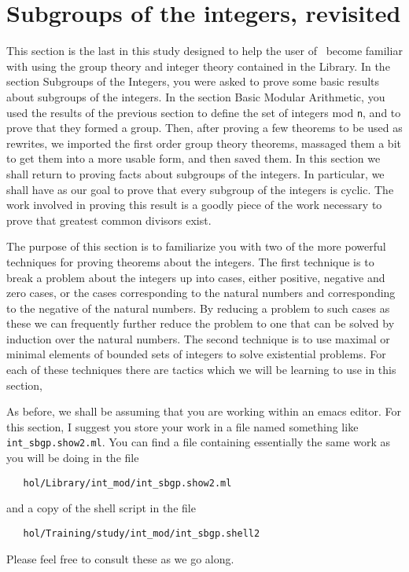 \section{Subgroups of the integers, revisited}

This section is the last in this study designed to help the user of
\HOL\ become familiar with using the group theory and integer theory
contained in the Library.  In the section Subgroups of the Integers,
you were asked to prove some basic results about subgroups of the
integers.  In the section Basic Modular Arithmetic, you used the
results of the previous section to define the set of integers mod
{\small\tt n}, and to prove that they formed a group.  Then, after
proving a few theorems to be used as rewrites, we imported the first
order group theory theorems, massaged them a bit to get them into a
more usable form, and then saved them.  In this section we shall
return to proving facts about subgroups of the integers.  In
particular, we shall have as our goal to prove that every subgroup of
the integers is cyclic.  The work involved in proving this result is a
goodly piece of the work necessary to prove that greatest common
divisors exist.

The purpose of this section is to familiarize you with two of the
more powerful techniques for proving theorems about the integers.
The first technique is to break a problem about the integers up into
cases, either positive, negative and zero cases, or the cases
corresponding to the natural numbers and corresponding to the negative
of the natural numbers.  By reducing a problem to such cases as these
we can frequently further reduce the problem to one that can be solved
by induction over the natural numbers.  The second technique is to use
maximal or minimal elements of bounded sets of integers to solve
existential problems.  For each of these techniques there are tactics
which we will be learning to use in this section,

As before, we shall be assuming that you are working within an emacs
editor.  For this section, I suggest you store your work in a file
named something like {\small\verb+int_sbgp.show2.ml+}.  You can find a
file containing essentially the same work as you will be doing in the
file
\begin{verbatim}
   hol/Library/int_mod/int_sbgp.show2.ml
\end{verbatim}
and a copy of the shell script in the file
\begin{verbatim}
   hol/Training/study/int_mod/int_sbgp.shell2
\end{verbatim}
Please feel free to consult these as we go along.

